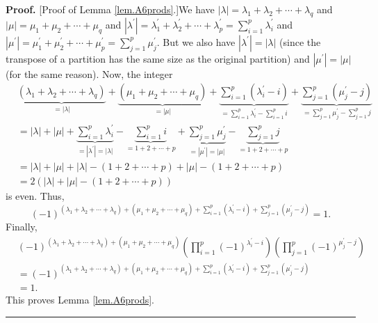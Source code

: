 \documentclass[numbers=enddot,12pt,final,onecolumn,notitlepage]{scrartcl}%
\theoremstyle{definition}
\newenvironment{proof}[1][Proof]{\noindent\textbf{#1.} }{\ \rule{0.5em}{0.5em}}
\let\sumnonlimits\sum
\let\prodnonlimits\prod
\renewcommand{\sum}{\sumnonlimits\limits}
\renewcommand{\prod}{\prodnonlimits\limits}
\begin{document}
\begin{enumerate}
\begin{proof}
[Proof of Lemma \ref{lem.A6prods}.]We have $\left\vert \lambda\right\vert
=\lambda_{1}+\lambda_{2}+\cdots+\lambda_{q}$ and $\left\vert \mu\right\vert
=\mu_{1}+\mu_{2}+\cdots+\mu_{q}$ and $\left\vert \lambda^{\prime}\right\vert
=\lambda_{1}^{\prime}+\lambda_{2}^{\prime}+\cdots+\lambda_{p}^{\prime}%
=\sum_{i=1}^{p}\lambda_{i}^{\prime}$ and $\left\vert \mu^{\prime}\right\vert
=\mu_{1}^{\prime}+\mu_{2}^{\prime}+\cdots+\mu_{p}^{\prime}=\sum_{j=1}^{p}%
\mu_{j}^{\prime}$. But we also have $\left\vert \lambda^{\prime}\right\vert
=\left\vert \lambda\right\vert $ (since the transpose of a partition has the
same size as the original partition) and $\left\vert \mu^{\prime}\right\vert
=\left\vert \mu\right\vert $ (for the same reason). Now, the integer%
\begin{align*}
&  \underbrace{\left(  \lambda_{1}+\lambda_{2}+\cdots+\lambda_{q}\right)
}_{=\left\vert \lambda\right\vert }+\underbrace{\left(  \mu_{1}+\mu_{2}%
+\cdots+\mu_{q}\right)  }_{=\left\vert \mu\right\vert }+\underbrace{\sum
_{i=1}^{p}\left(  \lambda_{i}^{\prime}-i\right)  }_{=\sum_{i=1}^{p}\lambda
_{i}^{\prime}-\sum_{i=1}^{p}i}+\underbrace{\sum_{j=1}^{p}\left(  \mu
_{j}^{\prime}-j\right)  }_{=\sum_{j=1}^{p}\mu_{j}^{\prime}-\sum_{j=1}^{p}j}\\
&  =\left\vert \lambda\right\vert +\left\vert \mu\right\vert +\underbrace{\sum
_{i=1}^{p}\lambda_{i}^{\prime}}_{=\left\vert \lambda^{\prime}\right\vert
=\left\vert \lambda\right\vert }-\underbrace{\sum_{i=1}^{p}i}_{=1+2+\cdots
+p}+\underbrace{\sum_{j=1}^{p}\mu_{j}^{\prime}}_{=\left\vert \mu^{\prime
}\right\vert =\left\vert \mu\right\vert }-\underbrace{\sum_{j=1}^{p}%
j}_{=1+2+\cdots+p}\\
&  =\left\vert \lambda\right\vert +\left\vert \mu\right\vert +\left\vert
\lambda\right\vert -\left(  1+2+\cdots+p\right)  +\left\vert \mu\right\vert
-\left(  1+2+\cdots+p\right)  \\
&  =2\left(  \left\vert \lambda\right\vert +\left\vert \mu\right\vert -\left(
1+2+\cdots+p\right)  \right)
\end{align*}
is even. Thus,%
\[
\left(  -1\right)  ^{\left(  \lambda_{1}+\lambda_{2}+\cdots+\lambda
_{q}\right)  +\left(  \mu_{1}+\mu_{2}+\cdots+\mu_{q}\right)  +\sum_{i=1}%
^{p}\left(  \lambda_{i}^{\prime}-i\right)  +\sum_{j=1}^{p}\left(  \mu
_{j}^{\prime}-j\right)  }=1.
\]
Finally,%
\begin{align*}
&  \left(  -1\right)  ^{\left(  \lambda_{1}+\lambda_{2}+\cdots+\lambda
_{q}\right)  +\left(  \mu_{1}+\mu_{2}+\cdots+\mu_{q}\right)  }\left(
\prod_{i=1}^{p}\left(  -1\right)  ^{\lambda_{i}^{\prime}-i}\right)  \left(
\prod_{j=1}^{p}\left(  -1\right)  ^{\mu_{j}^{\prime}-j}\right)  \\
&  =\left(  -1\right)  ^{\left(  \lambda_{1}+\lambda_{2}+\cdots+\lambda
_{q}\right)  +\left(  \mu_{1}+\mu_{2}+\cdots+\mu_{q}\right)  +\sum_{i=1}%
^{p}\left(  \lambda_{i}^{\prime}-i\right)  +\sum_{j=1}^{p}\left(  \mu
_{j}^{\prime}-j\right)  }\\
&  =1.
\end{align*}
This proves Lemma \ref{lem.A6prods}.
\end{proof}


\end{enumerate}
\end{document}
